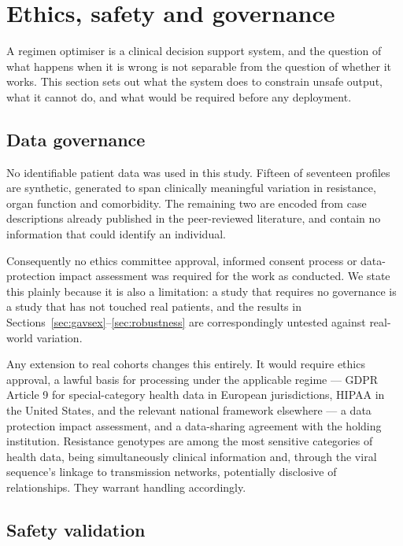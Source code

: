 \documentclass[conference]{IEEEtran}
\begin{document}
\section{Ethics, safety and governance}\label{sec:ethics}

A regimen optimiser is a clinical decision support system, and the question of what happens when it is wrong is not separable from the question of whether it works. This section sets out what the system does to constrain unsafe output, what it cannot do, and what would be required before any deployment.

\subsection{Data governance}

No identifiable patient data was used in this study. Fifteen of seventeen profiles are synthetic, generated to span clinically meaningful variation in resistance, organ function and comorbidity. The remaining two are encoded from case descriptions already published in the peer-reviewed literature, and contain no information that could identify an individual.

Consequently no ethics committee approval, informed consent process or data-protection impact assessment was required for the work as conducted. We state this plainly because it is also a limitation: a study that requires no governance is a study that has not touched real patients, and the results in Sections~\ref{sec:gavsex}--\ref{sec:robustness} are correspondingly untested against real-world variation.

Any extension to real cohorts changes this entirely. It would require ethics approval, a lawful basis for processing under the applicable regime --- GDPR Article 9 for special-category health data in European jurisdictions, HIPAA in the United States, and the relevant national framework elsewhere --- a data protection impact assessment, and a data-sharing agreement with the holding institution. Resistance genotypes are among the most sensitive categories of health data, being simultaneously clinical information and, through the viral sequence's linkage to transmission networks, potentially disclosive of relationships. They warrant handling accordingly.

\subsection{Safety validation}
\end{document}
